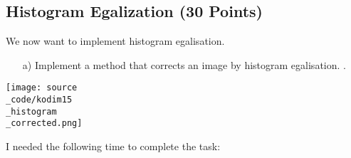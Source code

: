 \subsection{Histogram Egalization (30 Points)}

We now want to implement histogram egalisation. 

\begin{enumerate}
\item[a)] Implement a method that corrects an image by histogram egalisation. .
\end{enumerate}

\texttt{[image: source\\\_code/kodim15\\\_histogram\\\_corrected.png]}

I needed the following time to complete the task:

